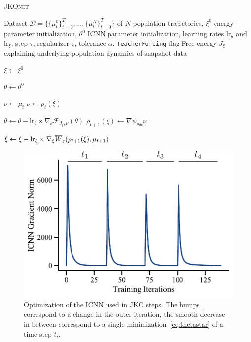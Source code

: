 \begin{algorithm}[t]
\caption{\textsc{JKOnet}}
\label{algo:jkonet}
\begin{algorithmic}


    Dataset $\mathcal{D}=\{\{\mu_t^0 \}_{t=0}^T, \ldots, \{\mu_t^N \}_{t=0}^T\}$ of $N$ population trajectories, $\xi^0$ energy parameter initialization, $\theta^0$ ICNN parameter initialization, learning rates $\text{lr}_\theta$ and $\text{lr}_\xi$, step $\tau$, regularizer $\varepsilon$, tolerance $\alpha$, {\texttt{TeacherForcing}} flag
    Free energy $J_{\xi}$ explaining underlying population dynamics of snapshot data
   \smallskip
   
   \STATE $\xi\leftarrow \xi^0$

   \STATE $\theta\leftarrow \theta^0$

    \STATE $\nu \leftarrow \mu_t$
   \ELSE
   \STATE $\nu \leftarrow \rho_t(\xi)$
   \ENDIF
    
   \STATE $\theta \leftarrow \theta - \text{lr}_\theta \times \nabla_\theta \mathcal{F}_{J_\xi,\nu}(\theta)$
   \ENDWHILE
   \STATE $\rho_{t+1}(\xi) \leftarrow \nabla \psi_{\theta \#} \nu$

   \STATE $\xi \leftarrow \xi - \text{lr}_\xi \times \nabla_\xi \overline{W}_{\varepsilon}(\rho_{t+1}(\xi), \mu_{t+1})$
   \ENDFOR
   \ENDFOR
	
\end{algorithmic}
\end{algorithm}

\begin{figure}
    \centering
    \includegraphics[width=\textwidth]{figures/fig_optimization_icnn.pdf}
    \caption{Optimization of the ICNN used in \acrshort{JKO} steps. The bumps correspond to a change in the outer iteration, the smooth decrease in between correspond to a single minimization~\eqref{eq:thetastar} of a time step $t_i$. }
    \label{fig:training_icnn}
\end{figure}

